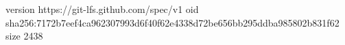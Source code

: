 version https://git-lfs.github.com/spec/v1
oid sha256:7172b7eef4ca962307993d6f40f62e4338d72be656bb295ddba985802b831f62
size 2438
